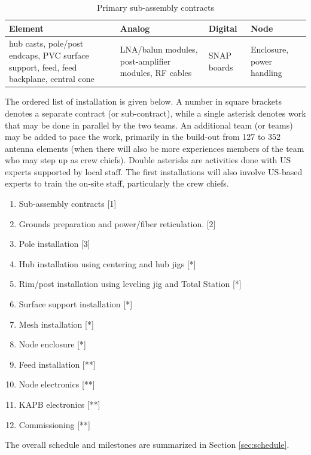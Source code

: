 \documentclass[preprint]{aastex}
\begin{document}
\begin{table}[tbh]
\centering
\label{tab:subassycontracts}
\caption{Primary sub-assembly contracts}
\begin{tabular}{| p{1.4in} | p{1.4in} | p{1.4in} | p{1.4in} |}\hline
\textbf{Element} & \textbf{Analog} & \textbf{Digital} & \textbf{Node} \\ \hline
hub casts, pole/post endcaps, PVC surface support, feed, feed backplane, central cone &
LNA/balun modules, post-amplifier modules, RF cables &
SNAP boards &
Enclosure, power handling \\ \hline
\end{tabular}
\end{table}

The ordered list of installation is given below. A number in square brackets denotes
a separate contract (or sub-contract), while a single asterisk denotes work that may
be done in parallel by the two teams. An additional team (or teams) may be added to
pace the work, primarily in the build-out from 127 to 352 antenna elements (when there will also be more
experiences members of the team who may step up as crew chiefs). Double asterisks are
activities done with US experts supported by local staff. The first installations
will also involve US-based experts to train the on-site staff, particularly the crew
chiefs.
\begin{enumerate}[itemsep=-3pt]
\item Sub-assembly contracts [1]
\item Grounds preparation and power/fiber reticulation. [2]
\item Pole installation [3]
\item Hub installation using centering and hub jigs  [*]
\item Rim/post installation using leveling jig and Total Station [*]
\item Surface support installation [*]
\item Mesh installation [*]
\item Node enclosure [*]
\item Feed installation [**]
\item Node electronics [**]
\item KAPB electronics [**]
\item Commissioning [**]
\end{enumerate}

The overall schedule and milestones are summarized in Section \ref{sec:schedule}.
\end{document}
